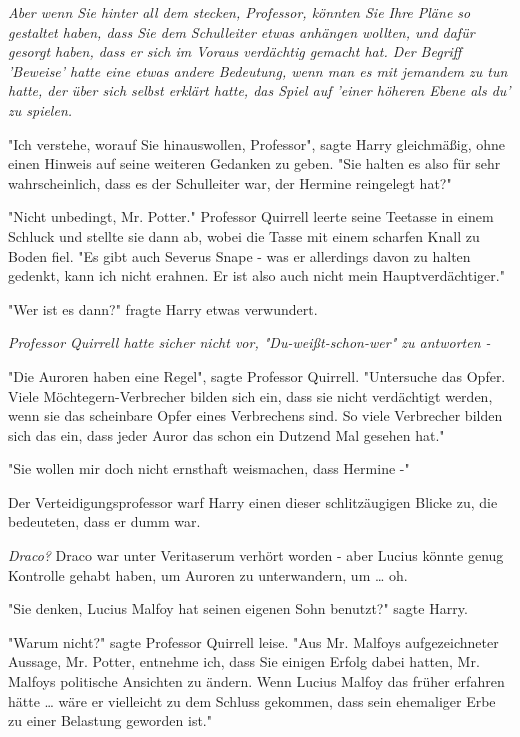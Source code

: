 {\emph{Aber wenn Sie hinter all dem stecken, Professor, könnten Sie Ihre Pläne so gestaltet haben, dass Sie dem Schulleiter etwas anhängen wollten, und dafür gesorgt haben, dass er sich im Voraus verdächtig gemacht hat. Der Begriff 'Beweise' hatte eine etwas andere Bedeutung, wenn man es mit jemandem zu tun hatte, der über sich selbst erklärt hatte, das Spiel auf 'einer höheren Ebene als du' zu spielen.}

"Ich verstehe, worauf Sie hinauswollen, Professor", sagte Harry gleichmäßig, ohne einen Hinweis auf seine weiteren Gedanken zu geben. "Sie halten es also für sehr wahrscheinlich, dass es der Schulleiter war, der Hermine reingelegt hat?"

"Nicht unbedingt, Mr. Potter." Professor Quirrell leerte seine Teetasse in einem Schluck und stellte sie dann ab, wobei die Tasse mit einem scharfen Knall zu Boden fiel. "Es gibt auch Severus Snape - was er allerdings davon zu halten gedenkt, kann ich nicht erahnen. Er ist also auch nicht mein Hauptverdächtiger."

"Wer ist es dann?" fragte Harry etwas verwundert.

\emph{Professor Quirrell hatte sicher nicht vor, "Du-weißt-schon-wer" zu antworten -}

"Die Auroren haben eine Regel", sagte Professor Quirrell. "Untersuche das Opfer. Viele Möchtegern-Verbrecher bilden sich ein, dass sie nicht verdächtigt werden, wenn sie das scheinbare Opfer eines Verbrechens sind. So viele Verbrecher bilden sich das ein, dass jeder Auror das schon ein Dutzend Mal gesehen hat."

"Sie wollen mir doch nicht ernsthaft weismachen, dass Hermine -"

Der Verteidigungsprofessor warf Harry einen dieser schlitzäugigen Blicke zu, die bedeuteten, dass er dumm war.

\emph{Draco?} Draco war unter Veritaserum verhört worden - aber Lucius könnte genug Kontrolle gehabt haben, um Auroren zu unterwandern, um … oh.

"Sie denken, Lucius Malfoy hat seinen eigenen Sohn benutzt?" sagte Harry.

"Warum nicht?" sagte Professor Quirrell leise. "Aus Mr. Malfoys aufgezeichneter Aussage, Mr. Potter, entnehme ich, dass Sie einigen Erfolg dabei hatten, Mr. Malfoys politische Ansichten zu ändern. Wenn Lucius Malfoy das früher erfahren hätte … wäre er vielleicht zu dem Schluss gekommen, dass sein ehemaliger Erbe zu einer Belastung geworden ist."

}
